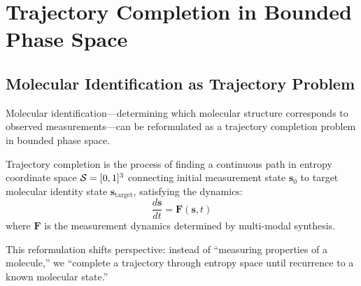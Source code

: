 \section{Trajectory Completion in Bounded Phase Space}
\label{sec:trajectory}

\subsection{Molecular Identification as Trajectory Problem}

Molecular identification—determining which molecular structure corresponds to observed measurements—can be reformulated as a trajectory completion problem in bounded phase space.

\begin{definition}
\label{def:trajectory_completion}
Trajectory completion is the process of finding a continuous path in entropy coordinate space $\mathcal{S} = [0,1]^3$ connecting initial measurement state $\mathbf{s}_0$ to target molecular identity state $\mathbf{s}_{\text{target}}$, satisfying the dynamics:
\begin{equation}
\frac{d\mathbf{s}}{dt} = \mathbf{F}(\mathbf{s}, t)
\end{equation}
where $\mathbf{F}$ is the measurement dynamics determined by multi-modal synthesis.
\end{definition}

This reformulation shifts perspective: instead of ``measuring properties of a molecule,'' we ``complete a trajectory through entropy space until recurrence to a known molecular state.''


